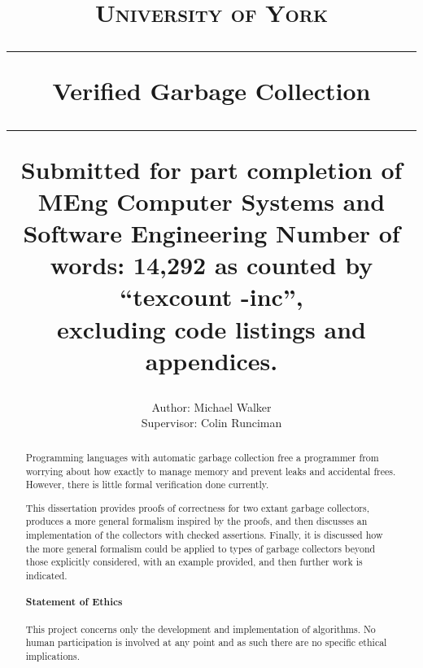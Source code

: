 \documentclass[11pt,a4paper,twoside,openany]{report}
\title{%
{\normalsize\scshape University of York}\\
\vspace{2em}
\hrule
\vspace{1em}
{\huge\bfseries Verified Garbage Collection}\\
\vspace{1em}
\hrule
\vspace{1em}
{\small Submitted for part completion of MEng Computer Systems and Software Engineering}
\vfill%
{\normalsize Number of words: 14,292 as counted by ``texcount -inc'',\\
excluding code listings and appendices.}
}
\author{%
Author: Michael Walker\\
Supervisor: Colin Runciman
}
\date{}
\theoremstyle{example}
\newenvironment{lscape2col}{%
  \begin{landscape}%
    \setlength{\topsep}{0pt}%
    \addtolength{\leftmargin}{-1cm}%
    \addtolength{\rightmargin}{-1cm}%
    \setlength{\listparindent}{\parindent}%
    \setlength{\itemindent}{\parindent}%
    \setlength{\parsep}{\parskip}%
    \setlength{\columnsep}{1.5cm}%
    \begin{multicols}{2}%
}{%
    \end{multicols}%
  \end{landscape}%
}
\begin{document}

\pagestyle{empty}

\maketitle

\cleardoublepage
\begin{abstract}
Programming languages with automatic garbage collection free a
programmer from worrying about how exactly to manage memory and
prevent leaks and accidental frees. However, there is little formal
verification done currently.

This dissertation provides proofs of correctness for two extant
garbage collectors, produces a more general formalism inspired by the
proofs, and then discusses an implementation of the collectors with
checked assertions. Finally, it is discussed how the more general
formalism could be applied to types of garbage collectors beyond those
explicitly considered, with an example provided, and then further work
is indicated.

\vfill

\paragraph{Statement of Ethics}

This project concerns only the development and implementation of
algorithms. No human participation is involved at any point and as
such there are no specific ethical implications.
\end{abstract}


\cleardoublepage
\pagestyle{plain}
\setcounter{page}{1}
\tableofcontents

\lstlistoflistings

\glsaddall
\printglossaries

\newpage
\cleardoublepage
{}










\begin{appendices}
\begin{lscape2col}
  
\end{lscape2col}
\end{appendices}



\end{document}
